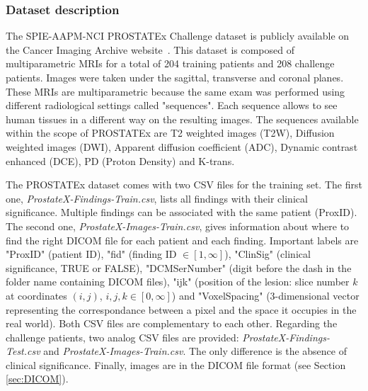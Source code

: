 \subsubsection{Dataset description}
\label{sec:prostatex_dataset_description}
\setlength{\marginparwidth}{3cm}\leavevmode {}The SPIE-AAPM-NCI PROSTATEx Challenge dataset is publicly available on the Cancer Imaging Archive website~\cite{33, 34, 35}. This dataset is composed of multiparametric MRIs for a total of 204 training patients and 208 challenge patients. Images were taken under the sagittal, transverse and coronal planes. These MRIs are multiparametric because the same exam was performed using different radiological settings called "sequences". Each sequence allows to see human tissues in a different way on the resulting images. The sequences available within the scope of PROSTATEx are T2 weighted images (T2W), Diffusion weighted images (DWI), Apparent diffusion coefficient (ADC), Dynamic contrast enhanced (DCE), PD (Proton Density) and K-trans. 

The PROSTATEx dataset comes with two CSV files for the training set. The first one, \textit{ProstateX-Findings-Train.csv}, lists all findings with their clinical significance. Multiple findings can be associated with the same patient (ProxID). The second one, \textit{ProstateX-Images-Train.csv}, gives information about where to find the right DICOM file for each patient and each finding. Important labels are "ProxID" (patient ID), "fid" (finding ID $\in [1,\infty]$), "ClinSig" (clinical significance, TRUE or FALSE), "DCMSerNumber" (digit before the dash in the folder name containing DICOM files), "ijk" (position of the lesion: slice number $k$ at coordinates $(i,j)$, $i,j,k \in [0,\infty]$) and "VoxelSpacing" (3-dimensional vector representing the correspondance between a pixel and the space it occupies in the real world). Both CSV files are complementary to each other. Regarding the challenge patients, two analog CSV files are provided: \textit{ProstateX-Findings-Test.csv} and \textit{ProstateX-Images-Train.csv}. The only difference is the absence of clinical significance. Finally, images are in the DICOM file format (see Section \ref{sec:DICOM}). 


